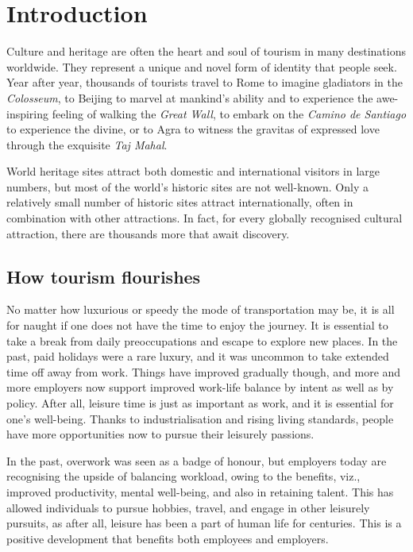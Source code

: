 \chapter{Introduction} %
\label{cha:intro}

Culture and heritage are often the heart and soul of tourism in many destinations worldwide. They represent a unique and novel form of identity that people seek. Year after year, thousands of tourists travel to Rome to imagine gladiators in the \emph{Colosseum}, to Beijing to marvel at mankind's ability and to experience the awe-inspiring feeling of walking the \emph{Great Wall}, to embark on the \emph{Camino de Santiago} to experience the divine, or to Agra to witness the gravitas of expressed love through the exquisite \emph{Taj Mahal}.

World heritage sites attract both domestic and international visitors in large numbers, but most of the world's historic sites are not well-known. Only a relatively small number of historic sites attract internationally, often in combination with other attractions. In fact, for every globally recognised cultural attraction, there are thousands more that await discovery.

\section{How tourism flourishes} %
\label{sec:htf}

No matter how luxurious or speedy the mode of transportation may be, it is all for naught if one does not have the time to enjoy the journey. It is essential to take a break from daily preoccupations and escape to explore new places. In the past, paid holidays were a rare luxury, and it was uncommon to take extended time off away from work. Things have improved gradually though, and more and more employers now support improved work-life balance by intent as well as by policy. After all, leisure time is just as important as work, and it is essential for one's well-being. Thanks to industrialisation and rising living standards, people have more opportunities now to pursue their leisurely passions.

In the past, overwork was seen as a badge of honour, but employers today are recognising the upside of balancing workload, owing to the benefits, viz., improved productivity, mental well-being, and also in retaining talent. This has allowed individuals to pursue hobbies, travel, and engage in other leisurely pursuits, as after all, leisure has been a part of human life for centuries. This is a positive development that benefits both employees and employers.

